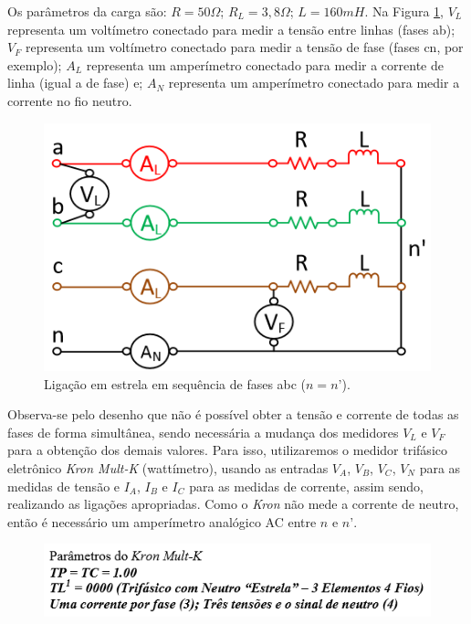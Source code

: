 \documentclass[a4paper,12pt,oneside,openany,table,xcdraw]{article}
\begin{document}
Os parâmetros da carga são: $R = 50\Omega$; $R_L = 3,8 \Omega$; $L = 160 mH$. Na Figura \ref{fig1}, $V_L$ representa um voltímetro conectado para medir a tensão entre linhas (fases ab); $V_F$ representa um voltímetro conectado para medir a tensão de fase (fases cn, por exemplo); $A_L$ representa um amperímetro conectado para medir a corrente de linha (igual a de fase) e; $A_N$ representa um amperímetro conectado para medir a corrente no fio neutro. 
\begin{figure}[H]
\centering
\captionsetup{font=scriptsize}
\includegraphics[width=14cm]{fig1}
\caption{Ligação em estrela em sequência de fases abc ($n = n’$).}
\label{fig1}
\end{figure}
Observa-se pelo desenho que não é possível obter a tensão e corrente de todas as fases de forma simultânea, sendo necessária a mudança dos medidores $V_L$ e $V_F$ para a obtenção dos demais valores. Para isso, utilizaremos o medidor trifásico eletrônico \textit{Kron Mult-K} (wattímetro),  usando as entradas $V_A$, $V_B$, $V_C$, $V_N$ para as medidas de tensão e $I_A$, $I_B$ e $I_C$ para as medidas de corrente, assim sendo, realizando as ligações apropriadas. Como o \textit{Kron} não mede a corrente de neutro, então é necessário um amperímetro analógico AC entre $n$ e $n’$.

\begin{figure}[H]
\centering
\captionsetup{font=scriptsize}
\includegraphics[width=13.5cm]{parametros1}
\end{figure}
\end{document}
